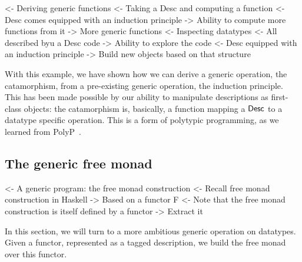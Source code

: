 
\begin{wstructure}
<- Deriving generic functions
    <- Taking a Desc and computing a function
        <- Desc comes equipped with an induction principle
        -> Ability to compute more functions from it
            -> More generic functions
    <- Inspecting datatypes
        <- All described byu a Desc code
        -> Ability to explore the code
            <- Desc equipped with an induction principle
            -> Build new objects based on that structure
\end{wstructure}

With this example, we have shown how we can derive a generic
operation, the catamorphism, from a pre-existing generic operation,
the induction principle. This has been made possible by our ability to
manipulate descriptions as first-class objects: the catamorphism is,
basically, a function mapping a $\Desc$ to a datatype specific
operation. This is a form of polytypic programming, as we learned from
PolyP~\cite{jansson:polyp}.


\subsection{The generic free monad}
\label{sec:desc-free-monad}

\begin{wstructure}
<- A generic program: the free monad construction
    <- Recall free monad construction in Haskell
        -> Based on a functor F
    <- Note that the free monad construction is itself defined by a functor
        -> Extract it
\end{wstructure}

In this section, we will turn to a more ambitious generic operation on
datatypes. Given a functor, represented as a tagged description, we
build the free monad over this functor.

